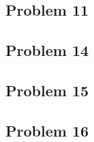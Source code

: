 \documentclass[]{article}
\begin{document}
\subsection{Problem 11}
\subsection{Problem 14}
\subsection{Problem 15}
\subsection{Problem 16}
\end{document}
